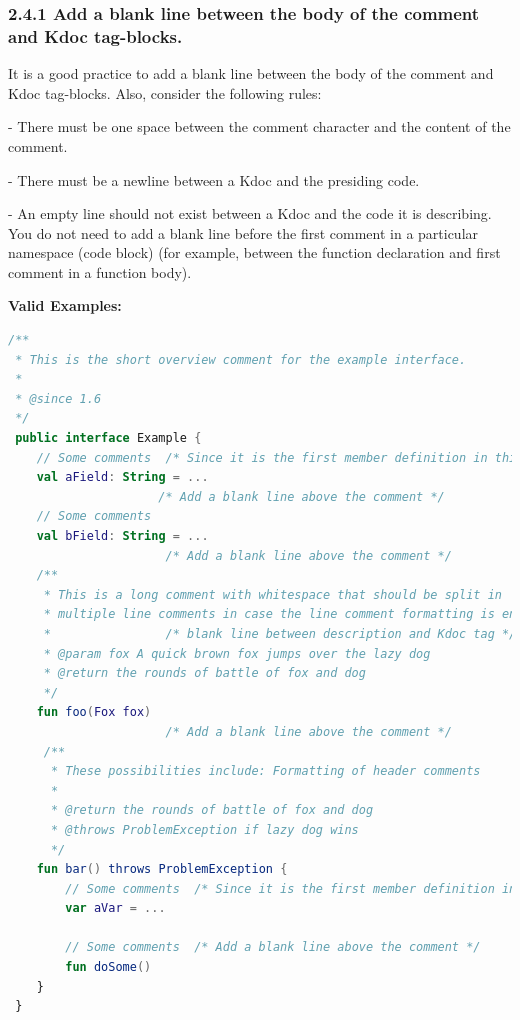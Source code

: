 \subsubsection*{\textbf{2.4.1 Add a blank line between the body of the comment and Kdoc tag-blocks.}}
\leavevmode\newline

\label{sec:2.4.1}



It is a good practice to add a blank line between the body of the comment and Kdoc tag-blocks. Also, consider the following rules:

- There must be one space between the comment character and the content of the comment.

- There must be a newline between a Kdoc and the presiding code.

- An empty line should not exist between a Kdoc and the code it is describing. You do not need to add a blank line before the first comment in a particular namespace (code block) (for example, between the function declaration and first comment in a function body).



\textbf{Valid Examples:}



\begin{lstlisting}[language=Kotlin]
/** 
 * This is the short overview comment for the example interface.
 * 
 * @since 1.6
 */
 public interface Example {
    // Some comments  /* Since it is the first member definition in this code block, there is no need to add a blank line here */
    val aField: String = ...
                     /* Add a blank line above the comment */
    // Some comments
    val bField: String = ...
                      /* Add a blank line above the comment */
    /**
     * This is a long comment with whitespace that should be split in 
     * multiple line comments in case the line comment formatting is enabled.
     *                /* blank line between description and Kdoc tag */
     * @param fox A quick brown fox jumps over the lazy dog
     * @return the rounds of battle of fox and dog 
     */
    fun foo(Fox fox)
                      /* Add a blank line above the comment */
     /**
      * These possibilities include: Formatting of header comments
      * 
      * @return the rounds of battle of fox and dog
      * @throws ProblemException if lazy dog wins
      */
    fun bar() throws ProblemException {
        // Some comments  /* Since it is the first member definition in this range, there is no need to add a blank line here */
        var aVar = ...

        // Some comments  /* Add a blank line above the comment */            
        fun doSome()
    }
 }
\end{lstlisting}


